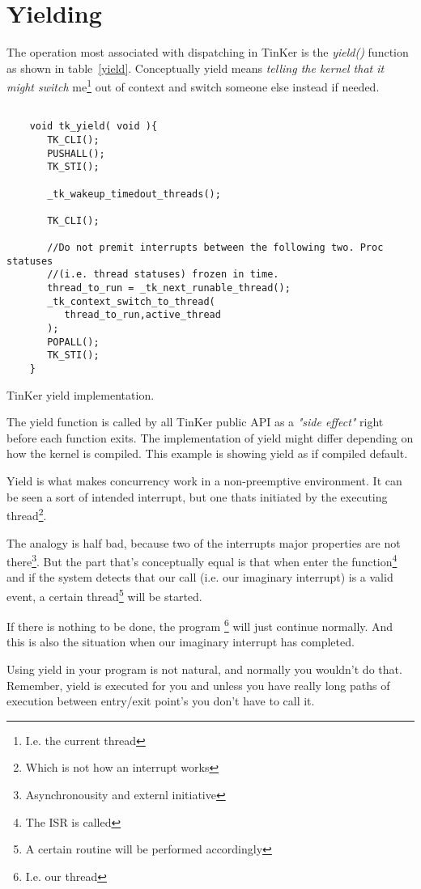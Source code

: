 \section{Yielding}
	The operation most associated with dispatching in TinKer is the \textit{yield()} function as shown in table~\ref{yield}. Conceptually yield means \textit{telling the kernel that it might switch} me\footnote{I.e. the current thread} out of context and switch someone else instead if needed.
	\begin{table}[!hbp]
	\begin{verbatim}

	void tk_yield( void ){
	   TK_CLI();   
	   PUSHALL();   
	   TK_STI();

	   _tk_wakeup_timedout_threads();
   
	   TK_CLI();
   
	   //Do not premit interrupts between the following two. Proc statuses 
	   //(i.e. thread statuses) frozen in time.
	   thread_to_run = _tk_next_runable_thread();
	   _tk_context_switch_to_thread(
	      thread_to_run,active_thread
	   );   
	   POPALL();
	   TK_STI();
	}
	\end{verbatim}
	\caption{TinKer yield implementation.\label{yield}}
	\end{table}
	The yield function is called by all TinKer public API as a \textit{"side effect"} right before each function exits. The implementation of yield might differ depending on how the kernel is compiled. This example is showing yield as if compiled default. 

	Yield is what makes concurrency work in a non-preemptive environment. It can be seen a sort of intended interrupt, but one thats initiated by the executing thread\footnote{Which is not how an interrupt works}.

	The analogy is half bad, because two of the interrupts major properties are not there\footnote{Asynchronousity and externl initiative}. But the part that's conceptually equal is that when enter the function\footnote{The ISR is called} and if the system detects that our call (i.e. our imaginary interrupt) is a valid event, a certain thread\footnote{A certain routine will be performed accordingly} will be started. 

	If there is nothing to be done, the program \footnote{I.e. our thread} will just continue normally. And this is also the situation when our imaginary interrupt has completed.

	Using yield in your program is not natural, and normally you wouldn't do that. Remember, yield is executed for you and unless you have really long paths of execution between entry/exit point's you don't have to call it.

